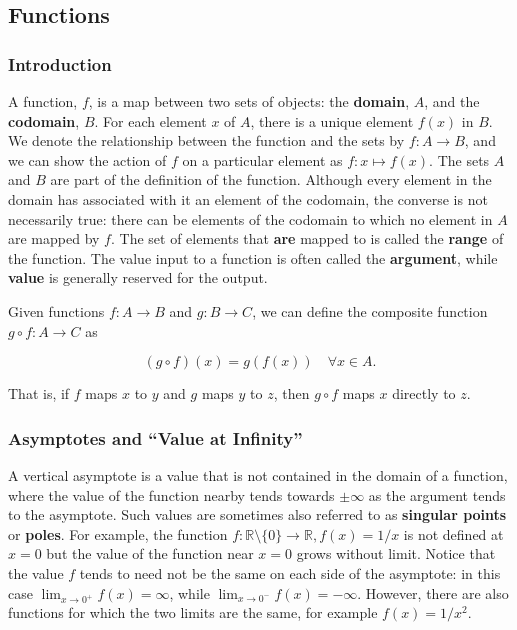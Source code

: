 \documentclass[11pt,titlepage]{article}
\numberwithin{equation}{subsection}
\begin{document}
\subsection{Functions}
\subsubsection{Introduction}
A function, $f$, is a map between two sets of objects: the \textbf{domain}, $A$, and the \textbf{codomain}, $B$. For each element $x$ of $A$, there is a unique element $f(x)$ in $B$. We denote the relationship between the function and the sets by $f:A\to B$, and we can show the action of $f$ on a particular element as $f:x\mapsto f(x)$. The sets $A$ and $B$ are part of the definition of the function. Although every element in the domain has associated with it an element of the codomain, the converse is not necessarily true: there can be elements of the codomain to which no element in $A$ are mapped by $f$. The set of elements that \textbf{are} mapped to is called the \textbf{range} of the function. The value input to a function is often called the \textbf{argument}, while \textbf{value} is generally reserved for the output.

Given functions $f:A\to B$ and $g:B\to C$, we can define the composite function $g\circ f:A\to C$ as

\begin{equation}
(g\circ f)(x) = g(f(x)) \quad \forall x \in A.
\end{equation}

That is, if $f$ maps $x$ to $y$ and $g$ maps $y$ to $z$, then $g\circ f$ maps $x$ directly to $z$.

\subsubsection{Asymptotes and “Value at Infinity”}
A vertical asymptote is a value that is not contained in the domain of a function, where the value of the function nearby tends towards $\pm\infty$ as the argument tends to the asymptote. Such values are sometimes also referred to as \textbf{singular points} or \textbf{poles}. For example, the function $f:\mathbb{R}\setminus\{0\}\rightarrow\mathbb{R}, f(x)=1/x$ is not defined at $x=0$ but the value of the function near $x=0$ grows without limit. Notice that the value $f$ tends to need not be the same on each side of the asymptote: in this case $\lim_{x\to 0^{+}} f(x) = \infty$, while $\lim_{x\to 0^{-}} f(x) = -\infty$. However, there are also functions for which the two limits are the same, for example $f(x)=1/x^{2}$.
\end{document}
